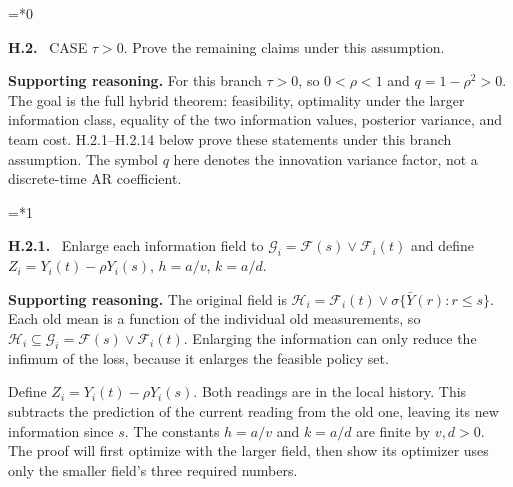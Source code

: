 \documentclass[12pt,letterpaper]{article}
\newcommand{\G}{\mathcal G}
\newcommand{\F}{\mathcal F}
\newcommand{\HH}{\mathcal H}
\newenvironment{proofstep}[2]{%
  \begin{list}{}{\leftmargin=\dimexpr 0.17in*#2\relax%
  \setlength{\rightmargin}{0pt}\setlength{\topsep}{5pt}\setlength{\parsep}{2pt}}%
  \item[]\textbf{\textcolor{ink}{#1.}}\ }{\end{list}}
\begin{document}
\begin{proofstep}{H.2}{0}
\label{step:H.2}
CASE $\tau>0$. Prove the remaining claims under this assumption.

\textbf{Supporting reasoning.}
For this branch $\tau>0$, so $0<\rho<1$ and $q=1-\rho^2>0$. The goal is the full hybrid theorem: feasibility, optimality under the larger information class, equality of the two information values, posterior variance, and team cost. H.2.1--H.2.14 below prove these statements under this branch assumption. The symbol $q$ here denotes the innovation variance factor, not a discrete-time AR coefficient.
\par{}
\end{proofstep}

\begin{proofstep}{H.2.1}{1}
\label{step:H.2.1}
Enlarge each information field to $\mathcal G_i=\mathcal F(s)\vee\mathcal F_i(t)$ and define $Z_i=Y_i(t)-\rho Y_i(s)$, $h=a/v$, $k=a/d$.

\textbf{Supporting reasoning.}
The original field is $\HH_i=\F_i(t)\vee\sigma\{\bar Y(r):r\le s\}$. Each old mean is a function of the individual old measurements, so $\HH_i\subseteq\G_i=\F(s)\vee\F_i(t)$. Enlarging the information can only reduce the infimum of the loss, because it enlarges the feasible policy set.

Define $Z_i=Y_i(t)-\rho Y_i(s)$. Both readings are in the local history. This subtracts the prediction of the current reading from the old one, leaving its new information since $s$. The constants $h=a/v$ and $k=a/d$ are finite by $v,d>0$. The proof will first optimize with the larger field, then show its optimizer uses only the smaller field's three required numbers.
\par{}
\end{proofstep}
\end{document}
